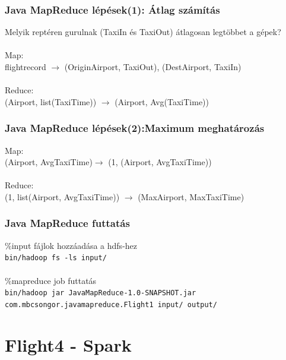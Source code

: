 \documentclass{beamer}
\begin{document}
\begin{frame}
\frametitle{Java MapReduce lépések(1): Átlag számítás}
Melyik reptéren gurulnak (TaxiIn és TaxiOut) átlagosan legtöbbet a gépek?  \\~\\
Map:\\
flightrecord $\rightarrow$ (OriginAirport, TaxiOut), (DestAirport, TaxiIn) \\~\\
Reduce:\\
 (Airport, list(TaxiTime)) $\rightarrow$ (Airport, Avg(TaxiTime))
\end{frame}


\begin{frame}
\frametitle{Java MapReduce lépések(2):Maximum meghatározás}
Map:\\
(Airport, AvgTaxiTime)$\rightarrow$ (1, (Airport, AvgTaxiTime)) \\~\\
Reduce:\\
(1, list(Airport, AvgTaxiTime)) $\rightarrow$ (MaxAirport, MaxTaxiTime)
\end{frame}


\begin{frame}
\frametitle{Java MapReduce futtatás}
\%input fájlok hozzáadása a hdfs-hez \\
\lstinline[basicstyle=\ttfamily\color{black}]|bin/hadoop fs -ls input/|   \\~\\
\%mapreduce job futtatás \\
\lstinline[basicstyle=\ttfamily\color{black}]|bin/hadoop jar JavaMapReduce-1.0-SNAPSHOT.jar| 
\lstinline[basicstyle=\ttfamily\color{black}]|com.mbcsongor.javamapreduce.Flight1 input/ output/|
\end{frame}

\section{Flight4 - Spark} %
\end{document}
